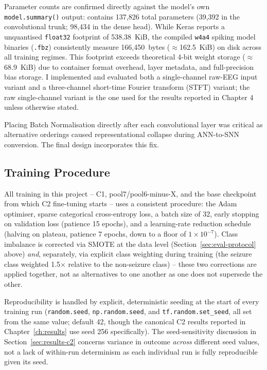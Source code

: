 Parameter counts are confirmed directly against the model's own \texttt{model.summary()} output: contains 137,826 total parameters (39,392 in the convolutional trunk; 98,434 in the dense head). While Keras reports a unquantised \texttt{float32} footprint of 538.38~KiB, the compiled \texttt{w4a4} spiking model binaries (\texttt{.fbz}) consistently measure 166,450~bytes ($\approx$162.5~KiB) on disk across all training regimes. This footprint exceeds theoretical 4-bit weight storage ($\approx$68.9~KiB) due to container format overhead, layer metadata, and full-precision bias storage. I implemented and evaluated both a
single-channel raw-EEG input variant and a three-channel short-time Fourier transform
(STFT) variant; the raw single-channel variant is the one used for the results reported in
Chapter 4 unless otherwise stated.

Placing Batch Normalisation directly after each convolutional layer was critical as alternative orderings caused representational collapse during ANN-to-SNN conversion. The final design incorporates this fix.
\subsection{Training Procedure}

All training in this project -- C1, pool7/pool6-minus-X, and the base checkpoint from which C2 fine-tuning starts -- uses a consistent procedure: the Adam optimiser, sparse categorical 
cross-entropy loss, a batch size of 32, early stopping on validation loss (patience 15 epochs), and a learning-rate reduction schedule (halving on plateau, patience 7 epochs, down to a 
floor of $1\times10^{-7}$). Class imbalance is corrected via SMOTE at the data level (Section~\ref{sec:eval-protocol} above) \emph{and}, separately, via explicit class weighting during 
training (the seizure class weighted 1.5$\times$ relative to the non-seizure class) -- these two corrections are applied together, not as alternatives to one another as one does not 
supersede the other.

Reproducibility is handled by explicit, deterministic seeding at the start of every training run (\texttt{random.seed}, \texttt{np.random.seed}, and \texttt{tf.random.set\_seed}, 
all set from the same value; default 42, though the canonical C2 results reported in Chapter~\ref{ch:results} use seed 256 specifically). The 
seed-sensitivity discussion in Section~\ref{sec:results-c2} concerns variance in outcome \emph{across} different seed values, not a lack of within-run determinism as each 
individual run is fully reproducible given its seed.

